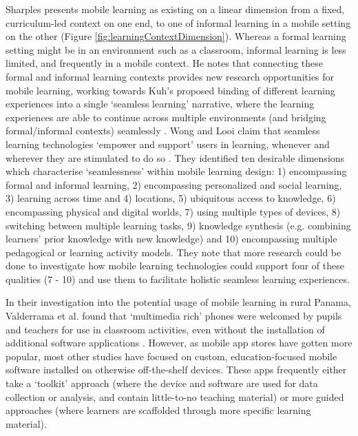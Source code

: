 Sharples presents mobile learning as existing on a linear dimension from a fixed, curriculum-led context on one end, to one of informal learning in a mobile setting on the other \citep{Sharples2013} (Figure \ref{fig:learningContextDimension}). Whereas a formal learning setting might be in an environment such as a classroom, informal learning is less limited, and frequently in a mobile context. He notes that connecting these formal and informal learning contexts provides new research opportunities for mobile learning, working towards Kuh’s proposed binding of different learning experiences into a single ‘seamless learning’ narrative, where the learning experiences are able to continue across multiple environments (and bridging formal/informal contexts) seamlessly \citep{Kuh1996}. Wong and Looi claim that seamless learning technologies ‘empower and support’ users in learning, whenever and wherever they are stimulated to do so \citep{Wong2011}. They identified ten desirable dimensions which characterise ‘seamlessness’ within mobile learning design: 1) encompassing formal and informal learning, 2) encompassing personalized and social learning, 3) learning across time and 4) locations, 5) ubiquitous access to knowledge, 6) encompassing physical and digital worlds, 7) using multiple types of devices, 8) switching between multiple learning tasks, 9) knowledge synthesis (e.g. combining learners’ prior knowledge with new knowledge) and 10) encompassing multiple pedagogical or learning activity models. They note that more research could be done to investigate how mobile learning technologies could support four of these qualities (7 - 10) and use them to facilitate holistic seamless learning experiences. 

In their investigation into the potential usage of mobile learning in rural Panama, Valderrama et al. found that ‘multimedia rich’ phones were welcomed by pupils and teachers for use in classroom activities, even without the installation of additional software applications \citep{ValderramaBahamondez2011}. However, as mobile app stores have gotten more popular, most other studies have focused on custom, education-focused mobile software installed on otherwise off-the-shelf devices. These apps frequently either take a `toolkit' approach (where the device and software are used for data collection or analysis, and contain little-to-no teaching material) or more guided approaches (where learners are scaffolded through more specific learning material). 

